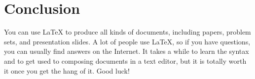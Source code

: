 \documentclass[12pt,notitlepage]{article}		%
\begin{document}
\section{Conclusion}


You can use LaTeX to produce all kinds of documents, including papers, problem sets, and presentation slides.  A lot of people use LaTeX, so if you have questions, you can usually find answers on the Internet.  It takes a while to learn the syntax and to get used to composing documents in a text editor, but it is totally worth it once you get the hang of it.  Good luck!
\end{document}
